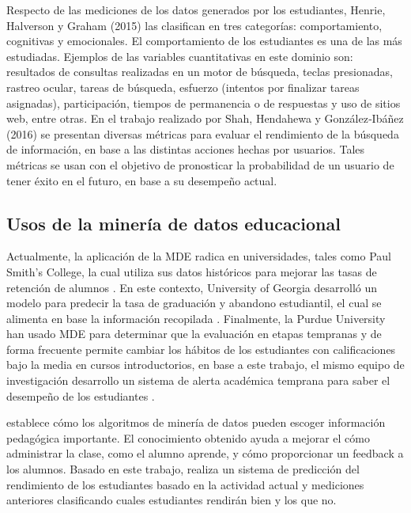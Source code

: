 Respecto de las mediciones de los datos generados por los estudiantes, Henrie, Halverson y Graham (2015) las clasifican en tres categorías: comportamiento, cognitivas y emocionales. El comportamiento de los estudiantes es una de las más estudiadas. Ejemplos de las variables cuantitativas en este dominio son: resultados de consultas realizadas en un motor de búsqueda, teclas presionadas, rastreo ocular, tareas de búsqueda, esfuerzo (intentos por finalizar tareas asignadas), participación, tiempos de permanencia o de respuestas y uso de sitios web, entre otras. En el trabajo realizado por Shah, Hendahewa y González‐Ibáñez (2016) se presentan diversas métricas para evaluar el rendimiento de la búsqueda de información, en base a las distintas acciones hechas por usuarios. Tales métricas se usan con el objetivo de pronosticar la probabilidad de un usuario de tener éxito en el futuro, en base a su desempeño actual.  


\subsection{Usos de la minería de datos educacional}


Actualmente, la aplicación de la MDE radica en universidades, tales como Paul Smith’s College, la cual utiliza sus datos históricos para mejorar las tasas de retención de alumnos \parencite{bichsel2012analytics}. En este contexto, University of Georgia desarrolló un modelo para predecir la tasa de graduación y abandono estudiantil, el cual se alimenta en base la información recopilada \parencite{morris2005predicting}. Finalmente, la Purdue University han usado MDE para determinar que la evaluación en etapas tempranas y de forma frecuente permite cambiar los hábitos de los estudiantes con calificaciones bajo la media en cursos introductorios, en base a este trabajo, el mismo equipo de investigación desarrollo un sistema de alerta académica temprana para saber el desempeño de los estudiantes \parencite{baepler2010academic}. 

\textcite{merceron2005educational} establece cómo los algoritmos de minería de datos pueden escoger información pedagógica importante. El conocimiento obtenido ayuda a mejorar el cómo administrar la clase, como el alumno aprende, y cómo proporcionar un feedback a los alumnos. Basado en este trabajo, \textcite{abdullah2014students} realiza un sistema de predicción del rendimiento de los estudiantes basado en la actividad actual y mediciones anteriores clasificando cuales estudiantes rendirán bien y los que no. 

